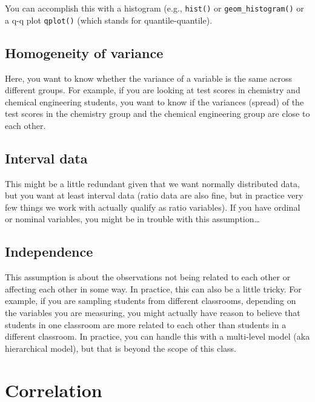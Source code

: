\documentclass[
]{book}
\begin{document}
You can accomplish this with a histogram (e.g., \texttt{hist()} or \texttt{geom\_histogram()} or a q-q plot \texttt{qplot()} (which stands for quantile-quantile).

\hypertarget{homogeneity-of-variance}{%
\subsection{Homogeneity of variance}\label{homogeneity-of-variance}}

Here, you want to know whether the variance of a variable is the same across different groups. For example, if you are looking at test scores in chemistry and chemical engineering students, you want to know if the variances (spread) of the test scores in the chemistry group and the chemical engineering group are close to each other.

\hypertarget{interval-data}{%
\subsection{Interval data}\label{interval-data}}

This might be a little redundant given that we want normally distributed data, but you want at least interval data (ratio data are also fine, but in practice very few things we work with actually qualify as ratio variables). If you have ordinal or nominal variables, you might be in trouble with this assumption\ldots{}

\hypertarget{independence}{%
\subsection{Independence}\label{independence}}

This assumption is about the observations not being related to each other or affecting each other in some way. In practice, this can also be a little tricky. For example, if you are sampling students from different classrooms, depending on the variables you are measuring, you might actually have reason to believe that students in one classroom are more related to each other than students in a different classroom. In practice, you can handle this with a multi-level model (aka hierarchical model), but that is beyond the scope of this class.

\hypertarget{correlation}{%
\section{Correlation}\label{correlation}}
\end{document}
